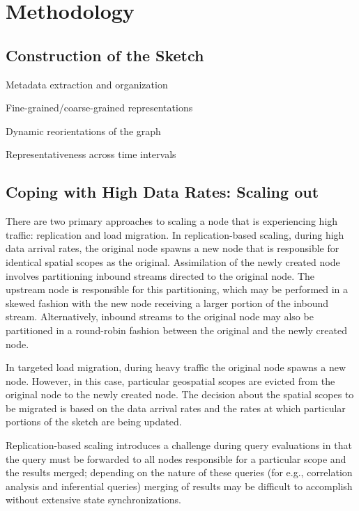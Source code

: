 \section{Methodology}
\label{sec:methodology}

\subsection{Construction of the Sketch}
Metadata extraction and organization

Fine-grained/coarse-grained representations

Dynamic reorientations of the graph

Representativeness across time intervals


\subsection{Coping with High Data Rates: Scaling out}
There are two primary approaches to scaling a node that is experiencing high traffic: replication and load migration.   In replication-based scaling, during high data arrival rates, the original node spawns a new node that is responsible for identical spatial scopes as the original. Assimilation of the newly created node involves partitioning inbound streams directed to the original node. The upstream node is responsible for this partitioning, which may be performed in a skewed fashion with the new node receiving a larger portion of the inbound stream.  Alternatively, inbound streams to the original node may also be partitioned in a round-robin fashion between the original and the newly created node.

In targeted load migration, during heavy traffic the original node spawns a new node. However, in this case, particular geospatial scopes are evicted from the original node to the newly created node. The decision about the spatial scopes to be migrated is based on the data arrival rates and the rates at which particular portions of the sketch are being updated.

Replication-based scaling introduces a challenge during query evaluations in that the query must be forwarded to all nodes responsible for a particular scope and the results merged; depending on the nature of these queries (for e.g., correlation analysis and inferential queries) merging of results may be difficult to accomplish without extensive state synchronizations.


